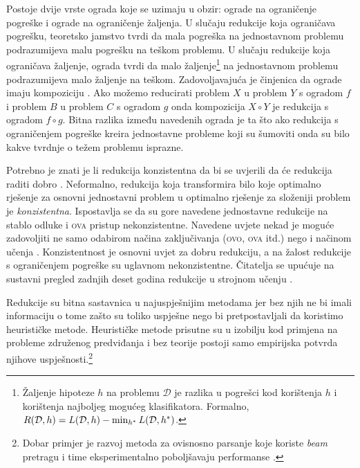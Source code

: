 Postoje dvije vrste ograda koje se uzimaju u obzir: ograde na ograničenje
pogreške i ograde na ograničenje žaljenja. U slučaju redukcije koja ograničava
pogrešku, teoretsko jamstvo tvrdi da mala pogreška na jednostavnom problemu
podrazumijeva malu pogrešku na teškom problemu. U slučaju redukcije koja
ograničava žaljenje, ograda tvrdi da malo žaljenje\footnote{Žaljenje hipoteze
$h$ na problemu $\mathcal{D}$ je razlika u pogrešci kod korištenja $h$ i
korištenja najboljeg mogućeg klasifikatora. Formalno, $R(\mathcal{D}, h) =
L(\mathcal{D}, h) - \min_{h\ssymbol{1}} L(\mathcal{D}, h\ssymbol{1})$.} na
jednostavnom problemu podrazumijeva malo žaljenje na teškom. Zadovoljavajuća je
činjenica da ograde imaju kompoziciju \citep{beygelzimer2005error}. Ako možemo
reducirati problem $X$ u problem $Y$ s ogradom $f$ i problem $B$ u problem $C$ s
ogradom $g$ onda kompozicija $X \circ Y$ je redukcija s ogradom $f \circ g$.
Bitna razlika između navedenih ograda je ta što ako redukcija s ograničenjem
pogreške kreira jednostavne probleme koji su šumoviti onda su bilo kakve tvrdnje
o težem problemu isprazne.

Potrebno je znati je li redukcija konzistentna  da bi se
uvjerili da će redukcija raditi dobro \citep{beygelzimer2009error,
daume15reductions}. Neformalno, redukcija koja transformira bilo koje optimalno
rješenje za osnovni jednostavni problem u optimalno rješenje za složeniji
problem je \textit{konzistentna}. Ispostavlja se da su gore navedene jednostavne
redukcije na stablo odluke i \textsc{ova} pristup nekonzistentne. Navedene
uvjete nekad je moguće zadovoljiti ne samo odabirom načina zaključivanja
(\textsc{ovo}, \textsc{ova} itd.) nego i načinom učenja \citep{abe2004iterative,
beygelzimer2005weighted}. Konzistentnost je osnovni uvjet za dobru redukciju, a
na žalost redukcije s ograničenjem pogreške su uglavnom nekonzistentne.
Čitatelja se upućuje na sustavni pregled zadnjih deset godina redukcije u
strojnom učenju \citep{daume15reductions}.

Redukcije su bitna sastavnica u najuspješnijim \lts{} metodama jer bez njih ne
bi imali informaciju o tome zašto su toliko uspješne nego bi pretpostavljali da
koristimo heurističke metode. Heurističke metode prisutne su u izobilju kod
primjena na probleme združenog predviđanja i bez teorije postoji samo empirijska
potvrda njihove uspješnosti.\footnote{Dobar primjer je razvoj metoda za
ovisnosno parsanje koje koriste \textit{beam} pretragu i time eksperimentalno
poboljšavaju performanse \citep{zhang2011transition, bohnet2012transition}.}
